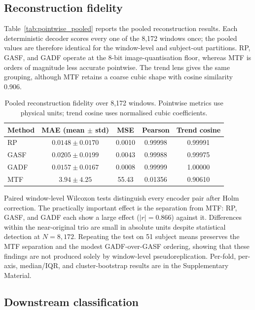 \documentclass[10pt,a4paper,parskip=half-]{scrartcl}
\begin{document}
\subsection{Reconstruction fidelity}

Table~\ref{tab:pointwise_pooled} reports the pooled reconstruction results. Each deterministic decoder scores every one of the 8,172 windows once; the pooled values are therefore identical for the window-level and subject-out partitions. RP, GASF, and GADF operate at the 8-bit image-quantisation floor, whereas MTF is orders of magnitude less accurate pointwise. The trend lens gives the same grouping, although MTF retains a coarse cubic shape with cosine similarity 0.906.

\begin{table}[!htbp]

\centering
\caption{Pooled reconstruction fidelity over 8,172 windows. Pointwise metrics use physical units; trend cosine uses normalised cubic coefficients.}
\label{tab:pointwise_pooled}
\label{tab:normalized_metrics}
\begin{tabular}{lcccc}
\toprule
Method & MAE (mean \(\pm\) std) & MSE & Pearson & Trend cosine \\
\midrule
RP   & \(0.0148\pm0.0170\) & 0.0010 & 0.99998 & 0.99991 \\
GASF & \(0.0205\pm0.0199\) & 0.0043 & 0.99988 & 0.99975 \\
GADF & \(0.0157\pm0.0167\) & 0.0008 & 0.99999 & 1.00000 \\
MTF  & \(3.94\pm4.25\)     & 55.43  & 0.01356 & 0.90610 \\
\bottomrule
\end{tabular}
\end{table}

Paired window-level Wilcoxon tests distinguish every encoder pair after Holm correction. The practically important effect is the separation from MTF: RP, GASF, and GADF each show a large effect (\(|r|=0.866\)) against it. Differences within the near-original trio are small in absolute units despite statistical detection at \(N=8{,}172\). Repeating the test on 51 subject means preserves the MTF separation and the modest GADF-over-GASF ordering, showing that these findings are not produced solely by window-level pseudoreplication. Per-fold, per-axis, median/IQR, and cluster-bootstrap results are in the Supplementary Material.

\subsection{Downstream classification}
\label{sec:subject_out_results}
\end{document}
